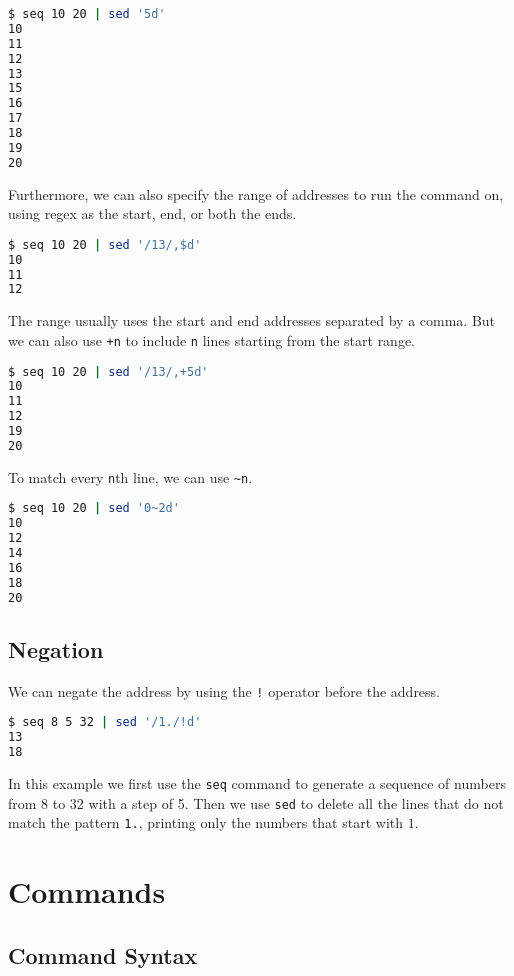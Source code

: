 \begin{lstlisting}[language=bash]
$ seq 10 20 | sed '5d'
10
11
12
13
15
16
17
18
19
20
\end{lstlisting}


Furthermore, we can also specify the range of addresses to run the command on, using regex as the start, end, or both the ends.

\begin{lstlisting}[language=bash]
$ seq 10 20 | sed '/13/,$d'
10
11
12
\end{lstlisting}

The range usually uses the start and end addresses separated by a comma. But we can also use \lstinline|+n| to include \lstinline|n| lines starting from the start range.

\begin{lstlisting}[language=bash]
$ seq 10 20 | sed '/13/,+5d'
10
11
12
19
20
\end{lstlisting}

To match every \lstinline|n|th line, we can use \lstinline|~n|.

\begin{lstlisting}[language=bash]
$ seq 10 20 | sed '0~2d'
10
12
14
16
18
20
\end{lstlisting}

\subsection{Negation}

We can negate the address by using the \lstinline|!| operator before the address.

\begin{lstlisting}[language=bash]
$ seq 8 5 32 | sed '/1./!d'
13
18
\end{lstlisting}

In this example we first use the \lstinline|seq| command to generate a sequence of numbers from 8 to 32 with a step of 5.
Then we use \lstinline|sed| to delete all the lines that do not match the pattern \lstinline|1.|, printing only the numbers that start with $1$.

\section{Commands}

\subsection{Command Syntax}

